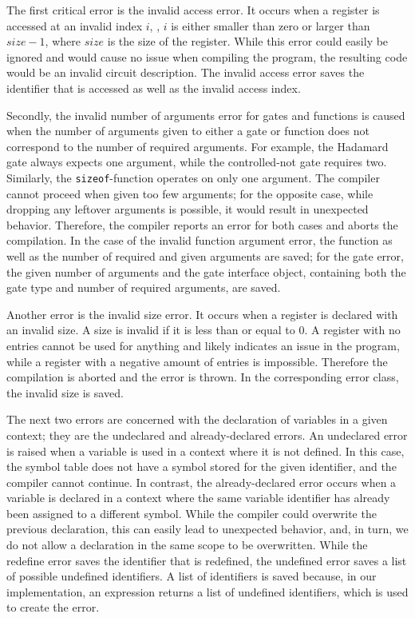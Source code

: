 The first critical error is the invalid access error. It occurs when a register is accessed at an invalid index $i$, \ie, $i$ is either smaller than zero or larger than $size - 1$, where $size$ is the size of the register. While this error could easily be ignored and would cause no issue when compiling the program, the resulting code would be an invalid circuit description. The invalid access error saves the identifier that is accessed as well as the invalid access index.

Secondly, the invalid number of arguments error for gates and functions is caused when the number of arguments given to either a gate or function does not correspond to the number of required arguments. For example, the Hadamard gate always expects one argument, while the controlled-not gate requires two. Similarly, the \texttt{sizeof}-function operates on only one argument. The compiler cannot proceed when given too few arguments; for the opposite case, while dropping any leftover arguments is possible, it would result in unexpected behavior.
Therefore, the compiler reports an error for both cases and aborts the compilation. In the case of the invalid function argument error, the function as well as the number of required and given arguments are saved; for the gate error, the given number of arguments and the gate interface object, containing both the gate type and number of required arguments, are saved.

Another error is the invalid size error. It occurs when a register is declared with an invalid size. A size is invalid if it is less than or equal to $0$. A register with no entries cannot be used for anything and likely indicates an issue in the program, while a register with a negative amount of entries is impossible. Therefore the compilation is aborted and the error is thrown. In the corresponding error class, the invalid size is saved.

The next two errors are concerned with the declaration of variables in a given context; they are the undeclared and already-declared errors. An undeclared error is raised when a variable is used in a context where it is not defined. In this case, the symbol table does not have a symbol stored for the given identifier, and the compiler cannot continue. In contrast, the already-declared error occurs when a variable is declared in a context where the same variable identifier has already been assigned to a different symbol. While the compiler could overwrite the previous declaration, this can easily lead to unexpected behavior, and, in turn, we do not allow a declaration in the same scope to be overwritten. While the redefine error saves the identifier that is redefined, the undefined error saves a list of possible undefined identifiers. A list of identifiers is saved because, in our implementation, an expression returns a list of undefined identifiers, which is used to create the error.

